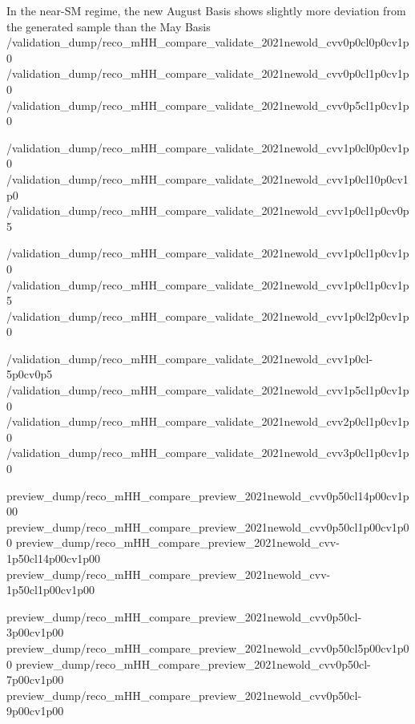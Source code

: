 
{In the near-SM regime, the new August Basis shows slightly more deviation
    from the generated sample than the May Basis}
{/validation_dump/reco_mHH_compare_validate_2021newold_cvv0p0cl0p0cv1p0}
{/validation_dump/reco_mHH_compare_validate_2021newold_cvv0p0cl1p0cv1p0}
{/validation_dump/reco_mHH_compare_validate_2021newold_cvv0p5cl1p0cv1p0}

{/validation_dump/reco_mHH_compare_validate_2021newold_cvv1p0cl0p0cv1p0}
{/validation_dump/reco_mHH_compare_validate_2021newold_cvv1p0cl10p0cv1p0}
{/validation_dump/reco_mHH_compare_validate_2021newold_cvv1p0cl1p0cv0p5}

{/validation_dump/reco_mHH_compare_validate_2021newold_cvv1p0cl1p0cv1p0}
{/validation_dump/reco_mHH_compare_validate_2021newold_cvv1p0cl1p0cv1p5}
{/validation_dump/reco_mHH_compare_validate_2021newold_cvv1p0cl2p0cv1p0}

{/validation_dump/reco_mHH_compare_validate_2021newold_cvv1p0cl-5p0cv0p5}
{/validation_dump/reco_mHH_compare_validate_2021newold_cvv1p5cl1p0cv1p0}
{/validation_dump/reco_mHH_compare_validate_2021newold_cvv2p0cl1p0cv1p0}
{/validation_dump/reco_mHH_compare_validate_2021newold_cvv3p0cl1p0cv1p0}




{preview_dump/reco_mHH_compare_preview_2021newold_cvv0p50cl14p00cv1p00}
{preview_dump/reco_mHH_compare_preview_2021newold_cvv0p50cl1p00cv1p00}
{preview_dump/reco_mHH_compare_preview_2021newold_cvv-1p50cl14p00cv1p00}
{preview_dump/reco_mHH_compare_preview_2021newold_cvv-1p50cl1p00cv1p00}

{preview_dump/reco_mHH_compare_preview_2021newold_cvv0p50cl-3p00cv1p00}
{preview_dump/reco_mHH_compare_preview_2021newold_cvv0p50cl5p00cv1p00}
{preview_dump/reco_mHH_compare_preview_2021newold_cvv0p50cl-7p00cv1p00}
{preview_dump/reco_mHH_compare_preview_2021newold_cvv0p50cl-9p00cv1p00}



